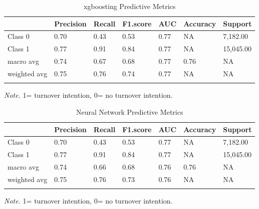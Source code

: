 \documentclass[
  man]{apa7}
\begin{document}
\begin{table}[tbp]

\begin{center}
\begin{threeparttable}

\caption{\label{tab:xgbtable40}xgboosting Predictive Metrics}

\begin{tabular}{lllllll}
\toprule
 & \multicolumn{1}{c}{Precision} & \multicolumn{1}{c}{Recall} & \multicolumn{1}{c}{F1.score} & \multicolumn{1}{c}{AUC} & \multicolumn{1}{c}{Accuracy} & \multicolumn{1}{c}{Support}\\
\midrule
Class 0 & 0.70 & 0.43 & 0.53 & 0.77 & NA & 7,182.00\\
Class 1 & 0.77 & 0.91 & 0.84 & 0.77 & NA & 15,045.00\\
macro avg & 0.74 & 0.67 & 0.68 & 0.77 & 0.76 & NA\\
weighted avg & 0.75 & 0.76 & 0.74 & 0.77 & NA & NA\\
\bottomrule
\addlinespace
\end{tabular}

\begin{tablenotes}[para]
\normalsize{\textit{Note.} 1= turnover intention, 0= no turnover intention.}
\end{tablenotes}

\end{threeparttable}
\end{center}

\end{table}

\begin{table}[tbp]

\begin{center}
\begin{threeparttable}

\caption{\label{tab:nn40}Neural Network Predictive Metrics}

\begin{tabular}{lllllll}
\toprule
 & \multicolumn{1}{c}{Precision} & \multicolumn{1}{c}{Recall} & \multicolumn{1}{c}{F1.score} & \multicolumn{1}{c}{AUC} & \multicolumn{1}{c}{Accuracy} & \multicolumn{1}{c}{Support}\\
\midrule
Class 0 & 0.70 & 0.43 & 0.53 & 0.77 & NA & 7,182.00\\
Class 1 & 0.77 & 0.91 & 0.84 & 0.77 & NA & 15,045.00\\
macro avg & 0.74 & 0.66 & 0.68 & 0.76 & 0.76 & NA\\
weighted avg & 0.75 & 0.76 & 0.73 & 0.76 & NA & NA\\
\bottomrule
\addlinespace
\end{tabular}

\begin{tablenotes}[para]
\normalsize{\textit{Note.} 1= turnover intention, 0= no turnover intention.}
\end{tablenotes}

\end{threeparttable}
\end{center}

\end{table}
\end{document}
